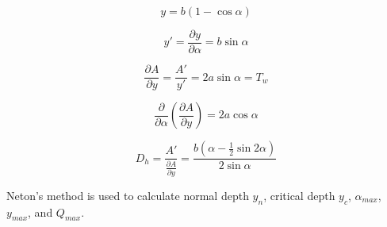 \begin{equation}
y = b(1 - \cos\alpha) 
\end{equation}

\begin{equation}
y' = \frac{\partial y}{\partial \alpha} = b \sin\alpha
\end{equation}

\begin{equation}
\frac{\partial A}{\partial y} = \frac{A'}{y'} = 2a\sin\alpha = T_w
\end{equation}

\begin{equation}
\frac{\partial }{\partial \alpha}\left(\frac{\partial A}{\partial y}\right) = 2a\cos\alpha
\end{equation}

\begin{equation}
D_h = \frac{A'}{\frac{\partial A}{\partial y}} = \frac{b(\alpha - \frac{1}{2}\sin 2 \alpha)}{ 2\sin\alpha}
\end{equation}

\noindent Neton's method is used to calculate normal depth $y_n$,  critical depth $y_c$, $\alpha_{max}$, $y_{max}$, and $Q_{max}$.










